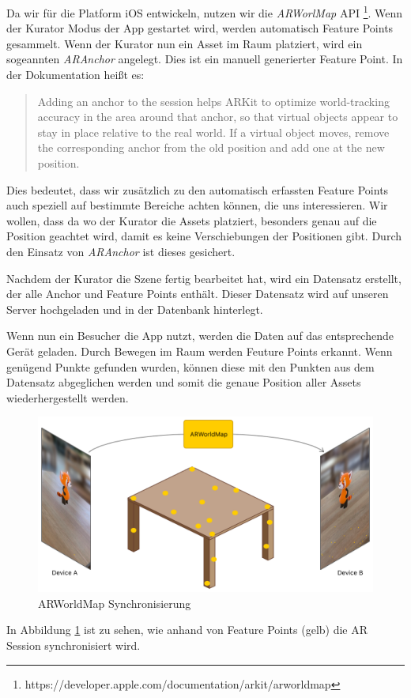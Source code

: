 \documentclass[titlepage, a4paper, 11pt]{scrartcl}
\begin{document}
  Da wir für die Platform iOS entwickeln, nutzen wir die \textit{ARWorlMap} API \footnote{https://developer.apple.com/documentation/arkit/arworldmap}.
  Wenn der Kurator Modus der App gestartet wird, werden automatisch Feature Points gesammelt.
  Wenn der Kurator nun ein Asset im Raum platziert, wird ein sogeannten \textit{ARAnchor} angelegt. Dies ist ein manuell generierter Feature Point.
  In der Dokumentation heißt es: 
  \begin{quote}
    Adding an anchor to the session helps ARKit to optimize world-tracking accuracy in the area around that anchor, so that virtual objects appear to stay in place relative to the real world. If a virtual object moves, remove the corresponding anchor from the old position and add one at the new position.
  \end{quote}
  Dies bedeutet, dass wir zusätzlich zu den automatisch erfassten Feature Points auch speziell auf bestimmte Bereiche achten können, die uns interessieren.
  Wir wollen, dass da wo der Kurator die Assets platziert, besonders genau auf die Position geachtet wird, damit es keine Verschiebungen der Positionen gibt.
  Durch den Einsatz von \textit{ARAnchor} ist dieses gesichert.

  Nachdem der Kurator die Szene fertig bearbeitet hat, wird ein Datensatz erstellt, der alle Anchor und Feature Points enthält.
  Dieser Datensatz wird auf unseren Server hochgeladen und in der Datenbank hinterlegt.

  Wenn nun ein Besucher die App nutzt, werden die Daten auf das entsprechende Gerät geladen.
  Durch Bewegen im Raum werden Feuture Points erkannt. Wenn genügend Punkte gefunden wurden, können diese mit den Punkten aus dem Datensatz abgeglichen werden und somit die genaue Position aller Assets wiederhergestellt werden.


  \begin{figure}[h]
    \centering
    \includegraphics[width=.5\textwidth]{ar-world-map}
    \caption{ARWorldMap Synchronisierung}
    \label{ARWorldMap}
  \end{figure}

  In Abbildung \ref{ARWorldMap} ist zu sehen, wie anhand von Feature Points (gelb) die AR Session synchronisiert wird.
\end{document}
